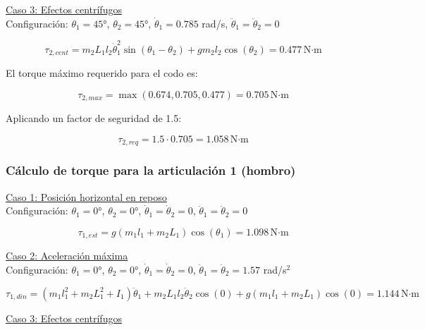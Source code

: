 \underline{Caso 3: Efectos centrífugos} \\

Configuración: $\theta_1 = 45°$, $\theta_2 = 45°$, $\dot{\theta}_1 = 0.785$ rad/s, $\ddot{\theta}_1 = \ddot{\theta}_2 = 0$

\begin{equation}
\tau_{2,cent} = m_2L_1l_2\dot{\theta}_1^2\sin(\theta_1 - \theta_2) + gm_2l_2\cos(\theta_2) = 0.477 \, \text{N·m}
\end{equation}

El torque máximo requerido para el codo es:

\begin{equation}
\tau_{2,max} = \max(0.674, 0.705, 0.477) = 0.705 \, \text{N·m}
\end{equation}

Aplicando un factor de seguridad de 1.5:

\begin{equation}
\tau_{2,req} = 1.5 \cdot 0.705 = 1.058 \, \text{N·m}
\end{equation}

\subsubsection{Cálculo de torque para la articulación 1 (hombro)}

\underline{Caso 1: Posición horizontal en reposo} \\

Configuración: $\theta_1 = 0°$, $\theta_2 = 0°$, $\dot{\theta}_1 = \dot{\theta}_2 = 0$, $\ddot{\theta}_1 = \ddot{\theta}_2 = 0$

\begin{equation}
\tau_{1,est} = g(m_1l_1 + m_2L_1)\cos(\theta_1) 
= 1.098 \, \text{N·m}
\end{equation}

\underline{Caso 2: Aceleración máxima} \\

Configuración: $\theta_1 = 0°$, $\theta_2 = 0°$, $\dot{\theta}_1 = \dot{\theta}_2 = 0$, $\ddot{\theta}_1 = \ddot{\theta}_2 = 1.57$ rad/s$^2$

\begin{equation}
\tau_{1,din} = (m_1l_1^2 + m_2L_1^2 + I_1)\ddot{\theta}_1 + m_2L_1l_2\ddot{\theta}_2\cos(0) + g(m_1l_1 + m_2L_1)\cos(0) = 1.144 \, \text{N·m}
\end{equation}

\underline{Caso 3: Efectos centrífugos} \\

